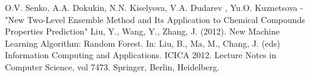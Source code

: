 \documentclass{article}
\begin{document}
\newpage



\begin{thebibliography}{}
	 O.V. Senko, A.A. Dokukin, N.N. Kiselyova, V.A. Dudarev
	, Yu.O. Kuznetsova - "New Two-Level Ensemble Method and Its Application to
	Chemical Compounds Properties Prediction"
	 Liu, Y., Wang, Y., Zhang, J. (2012). New Machine Learning Algorithm: Random Forest. In: Liu, B., Ma, M., Chang, J. (eds) Information Computing and Applications. ICICA 2012. Lecture Notes in Computer Science, vol 7473. Springer, Berlin, Heidelberg.
\end{thebibliography}
\end{document}
